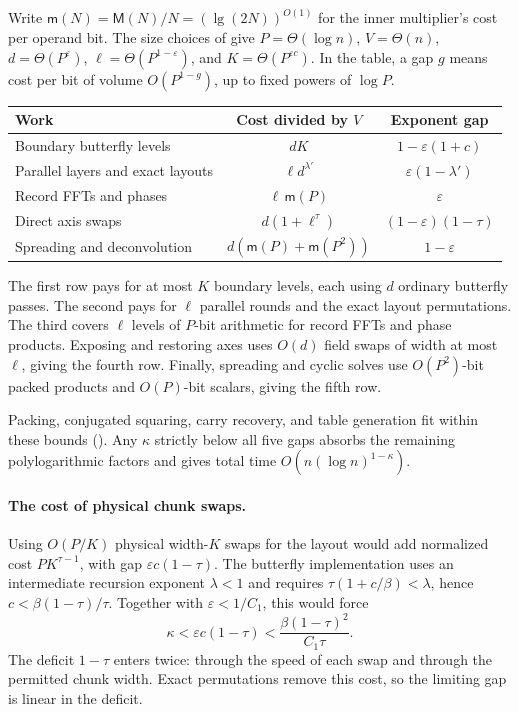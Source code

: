 \documentclass[11pt]{article}
\theoremstyle{definition}
\newcommand{\eps}{\varepsilon}
\begin{document}
Write $\mathsf m(N)=\mathsf M(N)/N=(\lg(2N))^{O(1)}$ for the inner multiplier's cost per operand bit.
The size choices of  give $P=\Theta(\log n)$, $V=\Theta(n)$,
$d=\Theta(P^\eps)$, $\ell=\Theta(P^{1-\eps})$, and $K=\Theta(P^{\eps c})$.
In the table, a gap $g$ means cost per bit of volume $O(P^{1-g})$, up to fixed powers of $\log P$.
\begin{center}
\small
\setlength{\tabcolsep}{5pt}
\begin{tabularx}{\linewidth}{@{}>{\raggedright\arraybackslash}Xcc@{}}
\toprule
\textbf{Work} & \textbf{Cost divided by $V$} & \textbf{Exponent gap}\\
\midrule
Boundary butterfly levels & $dK$ & $1-\eps(1+c)$\\
Parallel layers and exact layouts & $\ell d^{\lambda'}$ & $\eps(1-\lambda')$\\
Record FFTs and phases & $\ell\,\mathsf m(P)$ & $\eps$\\
Direct axis swaps & $d(1+\ell^\tau)$ & $(1-\eps)(1-\tau)$\\
Spreading and deconvolution & $d(\mathsf m(P)+\mathsf m(P^2))$ & $1-\eps$\\
\bottomrule
\end{tabularx}
\end{center}

The first row pays for at most $K$ boundary levels, each using $d$ ordinary butterfly passes.
The second pays for $\ell$ parallel rounds and the exact layout permutations.
The third covers $\ell$ levels of $P$-bit arithmetic for record FFTs and phase products.
Exposing and restoring axes uses $O(d)$ field swaps of width at most $\ell$, giving the fourth row.
Finally, spreading and cyclic solves use $O(P^2)$-bit packed products and $O(P)$-bit scalars, giving the fifth row.

Packing, conjugated squaring, carry recovery, and table generation fit within these bounds ().
Any $\kappa$ strictly below all five gaps absorbs the remaining polylogarithmic factors and gives total time $O(n(\log n)^{1-\kappa})$.

\paragraph{The cost of physical chunk swaps.}
Using $O(P/K)$ physical width-$K$ swaps for the layout would add normalized cost $PK^{\tau-1}$, with gap $\eps c(1-\tau)$.
The butterfly implementation uses an intermediate recursion exponent $\lambda<1$ and requires $\tau(1+c/\beta)<\lambda$, hence $c<\beta(1-\tau)/\tau$.
Together with $\eps<1/C_1$, this would force
\[
 \kappa<\eps c(1-\tau)<\frac{\beta(1-\tau)^2}{C_1\tau}.
\]
The deficit $1-\tau$ enters twice: through the speed of each swap and through the permitted chunk width.
Exact permutations remove this cost, so the limiting gap is linear in the deficit.
\end{document}
